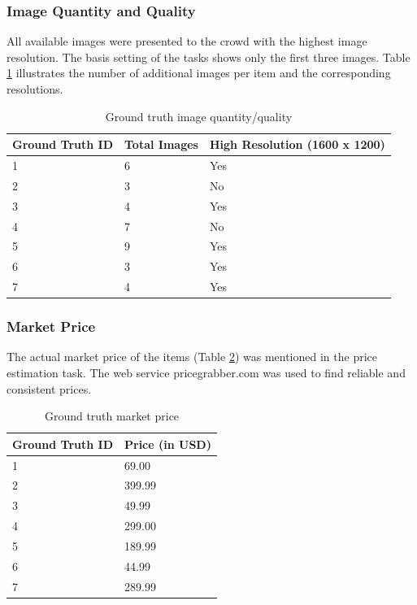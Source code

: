 \subsubsection{Image Quantity and Quality}
All available images were presented to the crowd with the highest image resolution. The basis setting of the tasks shows only the first three images. Table \ref{tab:res_img} illustrates the number of additional images per item and the corresponding resolutions.
\begin{table}[h!]
	\begin{center}
	\begin{tabular}{| p{4.33cm} | p{4.33cm} | p{4.33cm} |}
		\hline
		\textbf{Ground Truth ID} & \textbf{Total Images} & \textbf{High Resolution (1600 x 1200)} \\
		\hline
		1 & 6 & Yes \\
		\hline
		2 & 3 & No \\
		\hline
		3 & 4 & Yes \\
		\hline
		4 & 7 & No \\
		\hline
		5 & 9 & Yes \\
		\hline
		6 & 3 & Yes \\
		\hline
		7 & 4 & Yes \\
		\hline
	\end{tabular}
	\end{center}
	\caption{Ground truth image quantity/quality}
	\label{tab:res_img}
\end{table}
\subsubsection{Market Price}
The actual market price of the items (Table \ref{tab:market_prices}) was mentioned in the price estimation task. The web service pricegrabber.com was used to find reliable and consistent prices. 
\begin{table}[h!]
	\begin{center}
	\begin{tabular}{| p{6.5cm} | p{6.5cm} |}
		\hline
		\textbf{Ground Truth ID} & \textbf{Price (in USD)} \\
		\hline
		1 & 69.00 \\
		\hline
		2 & 399.99 \\
		\hline
		3 & 49.99 \\
		\hline
		4 & 299.00 \\
		\hline
		5 & 189.99 \\
		\hline
		6 & 44.99 \\
		\hline
		7 & 289.99 \\
		\hline
	\end{tabular}
	\end{center}
	\caption{Ground truth market price}
	\label{tab:market_prices}
\end{table}
